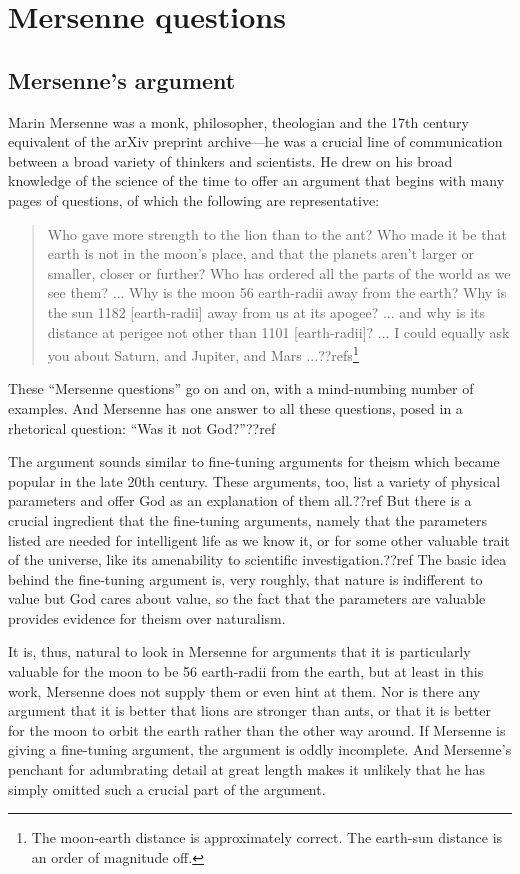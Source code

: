 \section{Mersenne questions}
\subsection{Mersenne's argument}
Marin Mersenne was a monk, philosopher, theologian and the 17th century equivalent of the arXiv preprint archive---he was 
a crucial line of communication between a broad variety of thinkers and scientists. He drew on his broad knowledge of
the science of the time to offer an argument that begins with many pages of questions, of which the following are
representative:
\begin{quote}
Who gave more strength to the lion than to the ant?
Who made it be that earth is not in the moon's place, and that the planets aren't larger or smaller, closer or further?
Who has ordered all the parts of the world as we see them?
...
Why is the moon 56 earth-radii away from the earth? Why is the sun 1182 [earth-radii] away from us at its apogee? ... and why is its distance at perigee not other than 1101 [earth-radii]? ...
I could equally ask you about Saturn, and Jupiter, and Mars ...??refs\footnote{The moon-earth distance is approximately correct.
The earth-sun distance is an order of magnitude off.}
\end{quote}
These ``Mersenne questions'' go on and on, with a mind-numbing number of examples. And Mersenne has one answer to all
these questions, posed in a rhetorical question: ``Was it not God?''??ref

The argument sounds similar to fine-tuning arguments for theism which became popular in the late 20th century. These
arguments, too, list a variety of physical parameters and offer God as an explanation of them all.??ref But there is
a crucial ingredient that the fine-tuning arguments, namely that the parameters listed are needed for intelligent life
as we know it, or for some other valuable trait of the universe, like its amenability to scientific investigation.??ref
The basic idea behind the fine-tuning argument is, very roughly, that nature is indifferent to value but God cares 
about value, so the fact that the parameters are valuable provides evidence for theism over naturalism.

It is, thus, natural to look in Mersenne for arguments that it is particularly valuable for the moon to be 56 earth-radii
from the earth, but at least in this work, Mersenne does not supply them or even hint at them. Nor is there any argument
that it is better that lions are stronger than ants, or that it is better for the moon to orbit the earth rather than
the other way around. If Mersenne is giving a fine-tuning argument, the argument is oddly incomplete. And Mersenne's
penchant for adumbrating detail at great length makes it unlikely that he has simply omitted such a crucial part of the
argument.

